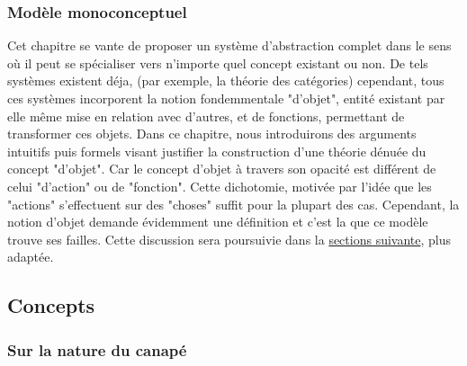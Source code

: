 \documentclass[10pt,b5paper, french]{book}
\begin{document}
\subsubsection{Modèle monoconceptuel}

Cet chapitre se vante de proposer un système d'abstraction complet dans le sens où il peut se spécialiser vers n'importe quel concept existant ou non. De tels systèmes existent déja, (par exemple, la théorie des catégories) cependant, tous ces systèmes incorporent la notion fondemmentale "d'objet", entité existant par elle même mise en relation avec d'autres, et de fonctions, permettant de transformer ces objets. Dans ce chapitre, nous introduirons des arguments intuitifs puis formels visant justifier la construction d'une théorie dénuée du concept "d'objet". Car le concept d'objet à travers son opacité est  différent de celui "d'action" ou de "fonction". Cette dichotomie, motivée par l'idée que les "actions" s'effectuent sur des "choses" suffit pour la plupart des cas. Cependant, la notion d'objet demande évidemment une définition et c'est la que ce modèle trouve ses failles. Cette discussion sera poursuivie dans la \hyperref[sec:Concepts]{sections suivante}, plus adaptée. 
 
\newpage
\subsection{Concepts}
\label{sec:Concepts}

\subsubsection{Sur la nature du canapé}
\end{document}
